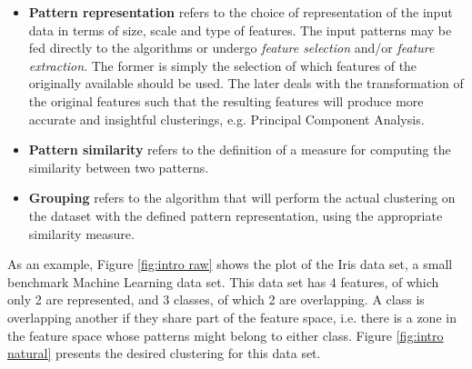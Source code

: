 \begin{itemize}
    \item \textbf{Pattern representation} refers to the choice of representation of the input data in terms of size, scale and type of features.
    The input patterns may be fed directly to the algorithms or undergo \emph{feature selection} and/or \emph{feature extraction}. The former is simply the selection of which features of the originally available should be used.
    The later deals with the transformation of the original features such that the resulting features will produce more accurate and insightful clusterings, e.g. Principal Component Analysis.

    \item \textbf{Pattern similarity} refers to the definition of a measure for computing the similarity between two patterns.
    \item \textbf{Grouping} refers to the algorithm that will perform the actual clustering on the dataset with the defined pattern representation, using the appropriate similarity measure.
\end{itemize}

As an example, Figure \ref{fig:intro raw} shows the plot of the Iris data set, a small benchmark Machine Learning data set.
This data set has 4 features, of which only 2 are represented, and 3 classes, of which 2 are overlapping.
A class is overlapping another if they share part of the feature space, i.e. there is a zone in the feature space whose patterns might belong to either class.
Figure \ref{fig:intro natural} presents the desired clustering for this data set.


